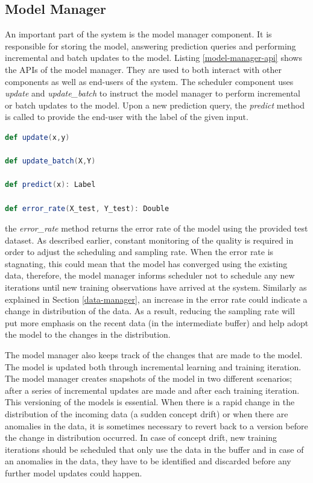 \documentclass{vldb}
\begin{document}
\subsection{Model Manager} \label{model-manager} 
An important part of the system is the model manager component.
It is responsible for storing the model, answering prediction queries and performing incremental and batch updates to the model.
Listing \ref{model-manager-api} shows the APIs of the model manager.
They are used to both interact with other components as well as end-users of the system.
The scheduler component uses \textit{update} and \textit{update\_batch} to instruct the model manager to perform incremental or batch updates to the model.
Upon a new prediction query, the \textit{predict} method is called to provide the end-user with the label of the given input.
\noindent\hspace{-0.1\linewidth}\begin{minipage}[t]{\linewidth}
\begin{lstlisting}[language=Scala, basicstyle=\small\ttfamily, frame=tb ,columns=fullflexible,
showstringspaces=false,label=model-manager-api,caption=Model Manager API, numberstyle=\tiny]
def update(x,y)

def update_batch(X,Y)

def predict(x): Label

def error_rate(X_test, Y_test): Double

\end{lstlisting}
\end{minipage}
the \textit{error\_rate} method returns the error rate of the model using the provided test dataset.
As described earlier, constant monitoring of the quality is required in order to adjust the scheduling and sampling rate.
When the error rate is stagnating, this could mean that the model has converged using the existing data, therefore, the model manager informs scheduler not to schedule any new iterations until new training observations have arrived at the system.
Similarly as explained in Section \ref{data-manager}, an increase in the error rate could indicate a change in distribution of the data.
As a result, reducing the sampling rate will put more emphasis on the recent data (in the intermediate buffer) and help adopt the model to the changes in the distribution.

The model manager also keeps track of the changes that are made to the model.
The model is updated both through incremental learning and training iteration.
The model manager creates snapshots of the model in two different scenarios; after a series of incremental updates are made and after each training iteration.
This versioning of the models is essential.
When there is a rapid change in the distribution of the incoming data (a sudden concept drift) or when there are anomalies in the data, it is sometimes necessary to revert back to a version before the change in distribution occurred.
In case of concept drift, new training iterations should be scheduled that only use the data in the buffer and in case of an anomalies in the data, they have to be identified and discarded before any further model updates could happen.
\end{document}
